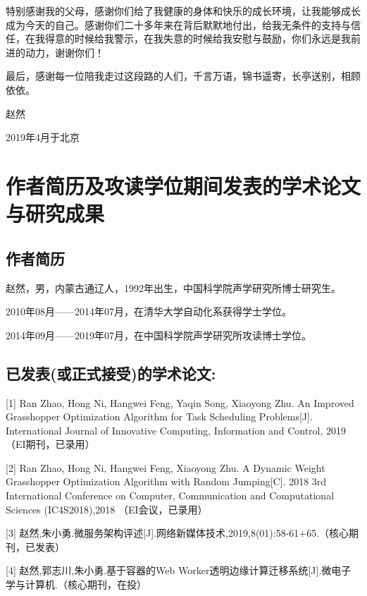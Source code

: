 特别感谢我的父母，感谢你们给了我健康的身体和快乐的成长环境，让我能够成长成为今天的自己。感谢你们二十多年来在背后默默地付出，给我无条件的支持与信任，在我得意的时候给我警示，在我失意的时候给我安慰与鼓励，你们永远是我前进的动力，谢谢你们！

最后，感谢每一位陪我走过这段路的人们，千言万语，锦书遥寄，长亭送别，相顾依依。

\begin{flushright}

    赵然

    2019年4月于北京


\end{flushright}


\chapter{作者简历及攻读学位期间发表的学术论文与研究成果}


\section*{作者简历}

赵然，男，内蒙古通辽人，1992年出生，中国科学院声学研究所博士研究生。

2010年08月——2014年07月，在清华大学自动化系获得学士学位。

2014年09月——2019年07月，在中国科学院声学研究所攻读博士学位。


\section*{已发表(或正式接受)的学术论文:}

[1] Ran Zhao, Hong Ni, Hangwei Feng, Yaqin Song, Xiaoyong Zhu. An Improved Grasshopper Optimization Algorithm for Task Scheduling Problems[J]. International Journal of Innovative Computing, Information and Control, 2019（EI期刊，已录用）

[2] Ran Zhao, Hong Ni, Hangwei Feng, Xiaoyong Zhu. A Dynamic Weight Grasshopper Optimization Algorithm with Random Jumping[C]. 2018 3rd International Conference on Computer, Communication and Computational Sciences (IC4S2018),2018 （EI会议，已录用）

[3] 赵然,朱小勇.微服务架构评述[J].网络新媒体技术,2019,8(01):58-61+65.（核心期刊，已发表）

[4] 赵然,郭志川,朱小勇.基于容器的Web Worker透明边缘计算迁移系统[J].微电子学与计算机.（核心期刊，在投）

